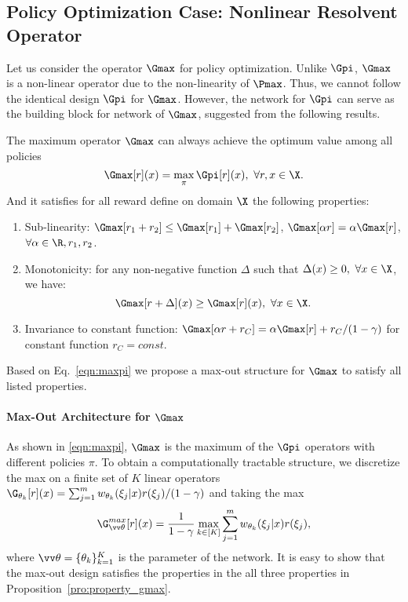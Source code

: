 \subsection{Policy Optimization Case:  Nonlinear Resolvent Operator}

Let us consider the operator $\Gmax$ for policy optimization. 
Unlike $\Gpi$, $\Gmax$ is a non-linear operator due to the non-linearity of $\Pmax$. 
Thus, we cannot follow the identical design $\Gpi$ for $\Gmax$.
However, the network for $\Gpi$ can serve as the building block for network of 
$\Gmax$, suggested from the following results. %
\begin{pro} \label{pro:property_gmax}
The maximum operator $\Gmax$ can always achieve the optimum value among all policies
\begin{equation}\label{eqn:maxpi}
    \Gmax[r](x) = \max_\pi \Gpi[r](x),~\forall r, x \in \X.
\end{equation}
And it satisfies for all reward define on domain $\X$ the following properties:
\begin{enumerate}
    \item Sub-linearity: $\Gmax [r_1 + r_2] \leq \Gmax[r_1] + \Gmax[r_2]$, $\Gmax[\alpha r] = \alpha \Gmax[r]$, $\forall \alpha\in \R, r_1, r_2$.
    \item Monotonicity: for any non-negative function $\Delta$ such that $\Delta(x)\geq 0,~\forall x\in \X$,
    we have:
    $$
    \Gmax [r+\Delta](x) \geq \Gmax[r](x),~\forall x\in \X.
    $$
    \item Invariance to constant function: $\Gmax[\alpha r + r_C] = \alpha \Gmax[r] + r_C/(1-\gamma)$ for constant function $r_C=const$. 
\end{enumerate}
\end{pro}

Based on Eq.~\eqref{eqn:maxpi}
we propose a max-out structure for $\Gmax$ to satisfy all listed properties.

\paragraph{Max-Out Architecture for $\Gmax$} 
As shown in \eqref{eqn:maxpi},  
$\Gmax$ is the maximum of the $\Gpi$ operators with different policies $\pi$. 
To obtain a computationally tractable structure, 
we discretize the max on a finite set of $K$ linear operators $\G_{\theta_k}[r](x) = \sum_{j=1}^m w_{\theta_k}(\xi_j|x)r(\xi_j)/(1-\gamma)$ and taking the max %
\begin{equation}\label{eqn:design_gmax_maxout}
    \G_{\vv\theta}^{max}[r](x) = \frac{1}{1-\gamma} \max_{k\in [K]}  \sum_{j=1}^m w_{\theta_k}(\xi_j|x) r(\xi_j),
\end{equation}
where $\vv\theta = \{\theta_k\}_{k=1}^K$ is the parameter of the network. 
It is easy to show that 
the max-out design \citep{goodfellow2013maxout} satisfies the properties in the all three properties in Proposition~\ref{pro:property_gmax}.  

